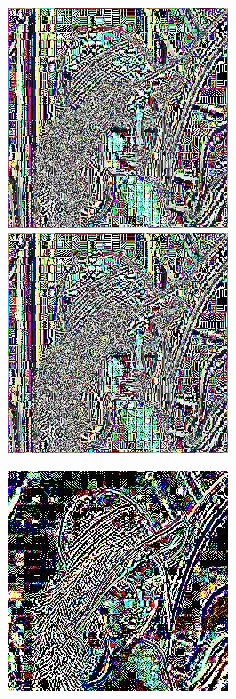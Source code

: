 \documentclass[a4paper,12pt]{article}
\begin{document}
\begin{figure}[h]
    \centering
\begin{minipage}[h]{.45\linewidth}
\centering
\includegraphics[width=0.55\linewidth]{preconditioning/lena_av7}
\end{minipage}
\hfill
\begin{minipage}[h]{0.45\linewidth}
\centering
\includegraphics[width=0.55\linewidth]{preconditioning/lena_av8}
\end{minipage}
\end{figure}

\begin{figure}[h]
    \centering
\begin{minipage}[h]{.45\linewidth}
\centering
\includegraphics[width=0.55\linewidth]{preconditioning/lena_paeth}
\end{minipage}
\hfill
\begin{minipage}[h]{0.45\linewidth}
\end{minipage}
\end{figure}
\end{document}
